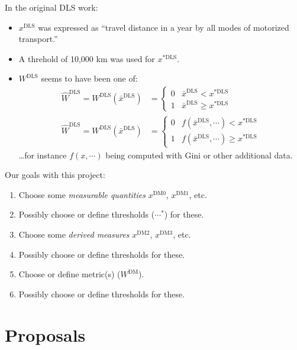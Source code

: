\documentclass[a5paper,11pt]{article}
\newcommand{\DLS}{\text{DLS}}
\newcommand{\DM}{\text{DM}}
\begin{document}
In the original DLS work:
\begin{itemize}
  \item $x^{\DLS}$ was expressed as “travel distance in a year by all modes of motorized transport.”
  \item A threhold of 10,000 km was used for $x^{\ast\DLS}$.
  \item $W^{\DLS}$ seems to have been one of:
    \begin{align}
      \hat{W}^{\DLS} = W^{\DLS}(\bar{x}^{\DLS}) & = \begin{cases}
        0 & \bar{x}^{\DLS} < x^{\ast\DLS} \\
        1 & \bar{x}^{\DLS} \geq x^{\ast\DLS}
      \end{cases} \\
      \hat{W}^{\DLS} = W^{\DLS}(\bar{x}^{\DLS}) & = \begin{cases}
        0 & f(\bar{x}^{\DLS}, \cdots) < x^{\ast\DLS} \\
        1 & f(\bar{x}^{\DLS}, \cdots) \geq x^{\ast\DLS}
      \end{cases}
    \end{align}
    …for instance $f(x, \cdots)$ being computed with Gini or other additional data.
\end{itemize}

\noindent Our goals with this project:
\begin{enumerate}
  \item Choose some \emph{measurable quantities} $x^{\DM0}$, $x^{\DM1}$, etc.
  \item Possibly choose or define thresholds ($\cdots^\ast$) for these.
  \item Choose some \emph{derived measures} $x^{\DM2}$, $x^{\DM3}$, etc.
  \item Possibly choose or define thresholds for these.
  \item Choose or define metric(s) ($W^{\DM}$).
  \item Possibly choose or define thresholds for these.
\end{enumerate}

\section {Proposals}
\end{document}
